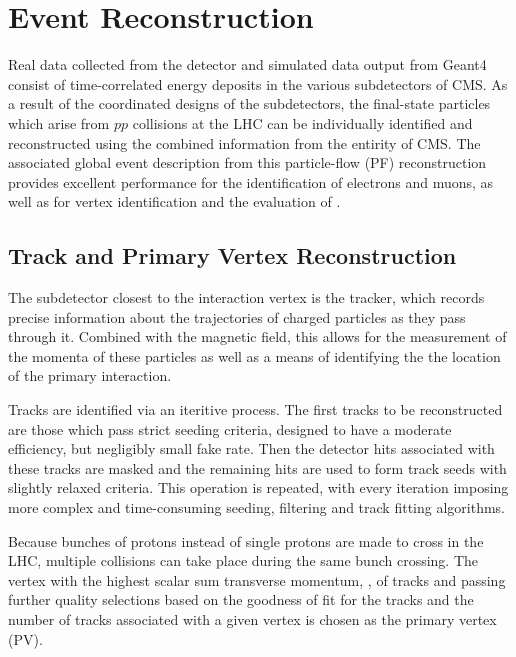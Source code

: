 
\chapter{Event Reconstruction}\label{sec:reconstruction}

 Real data collected from the detector
  and simulated data output from Geant4
  consist of time-correlated energy deposits
  in the various subdetectors of CMS.
 As a result of the coordinated designs 
  of the subdetectors, the final-state 
  particles which arise from $pp$ collisions 
  at the LHC can be individually identified
  and reconstructed using the combined
  information from the entirity of CMS.
 The associated global event description
  from this particle-flow (PF) reconstruction
  provides excellent performance for
  the identification of electrons and muons,
  as well as for vertex identification
  and the evaluation of \met.
 
\section{Track and Primary Vertex Reconstruction}
 The subdetector closest to the interaction vertex
  is the tracker, which records precise
  information about the trajectories of 
  charged particles as they pass through it.
 Combined with the magnetic field, 
  this allows for the measurement of the
  momenta of these particles as well as a
  means of identifying the the location of
  the primary interaction.

 Tracks are identified via an iteritive process. 
 The first tracks to be reconstructed
  are those which pass strict seeding
  criteria, designed to have a moderate
  efficiency, but negligibly small
  fake rate.
 Then the detector hits associated
  with these tracks are masked
  and the remaining hits are used to
  form track seeds with slightly relaxed
  criteria.
 This operation is repeated, with every
  iteration imposing more complex and time-consuming
  seeding, filtering and track fitting algorithms.
 
 Because bunches of protons instead of single protons
  are made to cross in the LHC, 
  multiple collisions can take place during the same
  bunch crossing.
 The vertex with the highest scalar sum
  transverse momentum, \pt,
  of tracks and passing further quality selections
  based on the goodness of fit for the tracks
  and the number of tracks associated with a given vertex
  is chosen as the primary vertex (PV).

